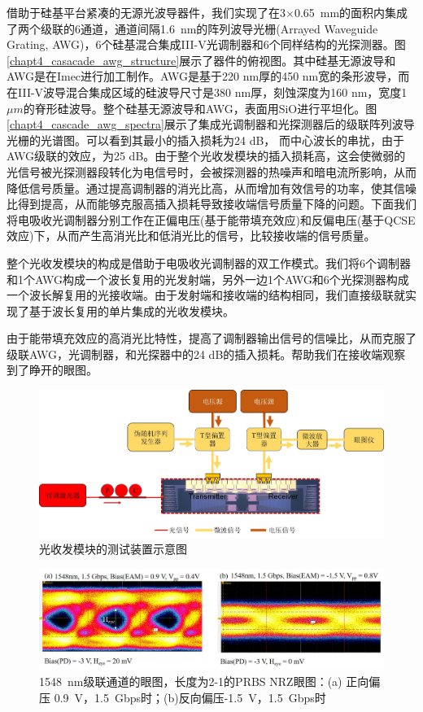 借助于硅基平台紧凑的无源光波导器件，我们实现了在3$\times$0.65~mm的面积内集成了两个级联的6通道，通道间隔1.6~nm的阵列波导光栅(Arrayed Waveguide Grating, AWG)，6个硅基混合集成III-V光调制器和6个同样结构的光探测器。图\ref{chapt4_casacade_awg_structure}展示了器件的俯视图。其中硅基无源波导和AWG是在Imec进行加工制作\cite{Imec}。AWG是基于220 nm厚的450 nm宽的条形波导，而在III-V波导混合集成区域的硅波导尺寸是380 nm厚，刻蚀深度为160 nm，宽度1 $\mu m$的脊形硅波导。整个硅基无源波导和AWG，表面用SiO进行平坦化。图\ref{chapt4_cascade_awg_spectra}展示了集成光调制器和光探测器后的级联阵列波导光栅的光谱图。可以看到其最小的插入损耗为24 dB， 而中心波长的串扰，由于AWG级联的效应，为25 dB。由于整个光收发模块的插入损耗高，这会使微弱的光信号被光探测器段转化为电信号时，会被探测器的热噪声和暗电流所影响，从而降低信号质量。通过提高调制器的消光比高，从而增加有效信号的功率，使其信噪比得到提高，从而能够克服高插入损耗导致接收端信号质量下降的问题。下面我们将电吸收光调制器分别工作在正偏电压(基于能带填充效应)和反偏电压(基于QCSE效应)下，从而产生高消光比和低消光比的信号，比较接收端的信号质量。

整个光收发模块的构成是借助于电吸收光调制器的双工作模式。我们将6个调制器和1个AWG构成一个波长复用的光发射端，另外一边1个AWG和6个光探测器构成一个波长解复用的光接收端。由于发射端和接收端的结构相同，我们直接级联就实现了基于波长复用的单片集成的光收发模块。

由于能带填充效应的高消光比特性，提高了调制器输出信号的信噪比，从而克服了级联AWG，光调制器，和光探器中的24 dB的插入损耗。帮助我们在接收端观察到了睁开的眼图。

\begin{figure}[htb]
	\centering
	\includegraphics[width=15cm]{./Pictures/chapt4_tranciever_measure.jpg}
	\caption{光收发模块的测试装置示意图}
	\label{chapt4_tranciever_measure}
\end{figure}

\begin{figure}[htb]
	\centering
	\includegraphics[width=15cm]{./Pictures/chapt4_cascade_eyediagram.jpg}
	\caption{1548~nm级联通道的眼图，长度为2-1的PRBS NRZ眼图：(a) 正向偏压 0.9~V，1.5~Gbps时；(b)反向偏压-1.5~V，1.5~Gbps时}
	\label{chapt4_cascade_eyediagram}
\end{figure}

